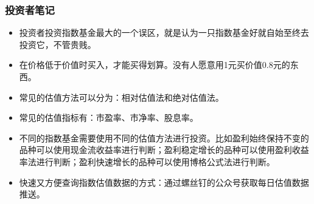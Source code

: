 \subsubsection{投资者笔记}

\begin{itemize}
\item {\kaishu 投资者投资指数基金最大的一个误区，就是认为一只指数基金好就自始至终去投资它，不管贵贱。}
\item {\kaishu 在价格低于价值时买入，才能买得划算。没有人愿意用1元买价值0.8元的东西。}
\item {\kaishu 常见的估值方法可以分为：相对估值法和绝对估值法。}
\item {\kaishu 常见的估值指标有：市盈率、市净率、股息率。}
\item {\kaishu 不同的指数基金需要使用不同的估值方法进行投资。比如盈利始终保持不变的品种可以使用现金流收益率进行判断；盈利稳定增长的品种可以使用盈利收益率法进行判断；盈利快速增长的品种可以使用博格公式法进行判断。}
\item {\kaishu 快速又方便查询指数估值数据的方式：通过螺丝钉的公众号获取每日估值数据推送。}
\end{itemize}

